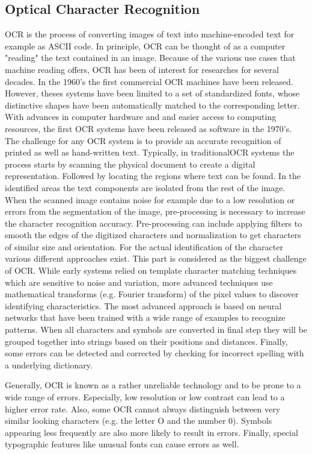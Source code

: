 \subsection{Optical Character Recognition}
\ac{OCR} is the process of converting images of text into machine-encoded text for example as ASCII code. In principle, \ac{OCR} can be thought of as a computer "reading" the text contained in an image. \cite{eikvil1993optical}
Because of the various use cases that machine reading offers, \ac{OCR} has been of interest for researches for several decades. In the 1960's the first commercial \ac{OCR} machines have been released. However, theses systems have been limited to a set of standardized fonts, whose distinctive shapes have been automatically matched to the corresponding letter. 
With advances in computer hardware and and easier access to computing resources, the first \ac{OCR} systems have been released as software in the 1970's. 
The challenge for any \ac{OCR} system is to provide an accurate recognition of printed as well as hand-written text.
Typically, in traditional\ac{OCR} systems the process starts by scanning the physical document to create a digital representation. Followed by locating the regions where text can be found. In the identified areas the text components are isolated from the rest of the image. When the scanned image contains noise for example due to a low resolution or errors from the segmentation of the image, pre-processing is necessary to increase the character recognition accuracy. Pre-processing can include applying filters to smooth the edges of the digitized characters and normalization to get characters of similar size and orientation. For the actual identification of the character various different approaches exist. This part is considered as the biggest challenge of \ac{OCR}. While early systems relied on template character matching techniques which are sensitive to noise and variation, more advanced techniques use mathematical transforms (e.g. Fourier transform) of the pixel values to discover identifying characteristics. The most advanced approach is based on neural networks that have been trained with a wide range of examples to recognize patterns. When all characters and symbols are converted in final step they will be grouped together into strings based on their positions and distances. Finally, some errors can be detected and corrected by checking for incorrect spelling with a underlying dictionary.
\cite{eikvil1993optical,nagy1999optical}

Generally, \ac{OCR} is known as a rather unreliable technology and to be prone to a wide range of errors. Especially, low resolution or low contrast can lead to a higher error rate. Also, some \ac{OCR} cannot always distinguish between very similar looking characters (e.g. the letter O and the number 0). Symbols appearing less frequently are also more likely to result in errors. Finally, special typographic features like unusual fonts can cause errors as well.
\cite{nagy1999optical,baird2004robust}

